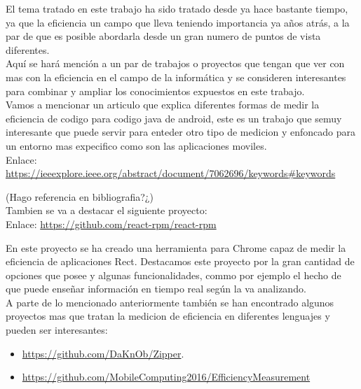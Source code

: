 
El tema tratado en este trabajo ha sido tratado desde ya  hace bastante tiempo, ya que la eficiencia un campo que lleva teniendo importancia ya años atrás, a la par de que es posible abordarla desde un gran numero de puntos de vista diferentes.\\

Aquí se hará mención a un par de trabajos o proyectos que tengan que ver con mas con la eficiencia en el campo de la informática y se consideren interesantes para combinar y ampliar los conocimientos expuestos en este trabajo.\\

Vamos a mencionar un articulo que explica diferentes formas de medir la eficiencia de codigo para codigo java de android, este es un trabajo que semuy  interesante que puede servir para enteder otro tipo  de medicion y enfoncado para un entorno mas expecifico como son las aplicaciones moviles.\\

Enlace: \url{https://ieeexplore.ieee.org/abstract/document/7062696/keywords#keywords} 

(Hago referencia en bibliografia?¿)\\

Tambien se va a destacar el siguiente proyecto:\\

Enlace: \url{https://github.com/react-rpm/react-rpm}

En este proyecto se ha creado una herramienta  para Chrome capaz de medir la eficiencia de aplicaciones Rect. Destacamos este proyecto por la gran cantidad de opciones que posee y algunas funcionalidades, commo por ejemplo el hecho de que puede enseñar información en tiempo real según la va analizando.\\


A parte de lo mencionado anteriormente también se han encontrado algunos proyectos mas que tratan la medicion de eficiencia en diferentes lenguajes y pueden ser interesantes:\\
\begin{itemize}
	\item \url{https://github.com/DaKnOb/Zipper}.
	\item \url{https://github.com/MobileComputing2016/EfficiencyMeasurement}
\end{itemize}



